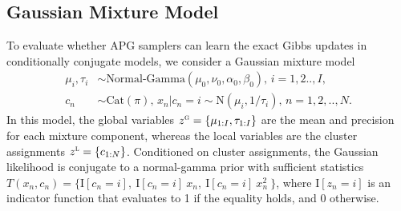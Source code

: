 \documentclass{article}
\theoremstyle{definition}
\begin{document}


\subsection{Gaussian Mixture Model}
\label{sec:gmm}
\vspace{-0.5em}
To evaluate whether APG samplers can learn the exact Gibbs updates in conditionally conjugate models, we consider a Gaussian mixture model 
\begin{align*}
    \mu_i, \tau_i &\sim \text{Normal-Gamma}(\mu_0, \nu_0, \alpha_0, \beta_0)
    , \,
    i =1,2..,I, \\
    c_n &\sim \mathrm{Cat}(\pi), \,
    x_n | c_n\!=\!i \sim \text{N}(\mu_i, 1 / \tau_i)
    , \,
    n =1,2,..,N.
\end{align*}
In this model, the global variables $z^\textsc{g} = \{\mu_{1:I}, \tau_{1:I}\}$ are the mean and precision for each mixture component, whereas the local variables are the cluster assignments $z^\textsc{l} = \{c_{1:N}\}$. Conditioned on cluster assignments, the Gaussian likelihood  is conjugate to a normal-gamma prior with sufficient statistics $T(x_n, c_n)=\bigg\{\mathrm{I}[c_n \!=\! i], 
        ~\mathrm{I}[c_n \!=\! i] \: x_n, 
        ~\mathrm{I}[c_n \!=\! i] \: x_n^2 
        ~\bigg\}$,
where $\mathrm{I}[z_n \!=\! i]$ is an indicator function that evaluates to 1 if the equality holds, and 0 otherwise.
\end{document}
